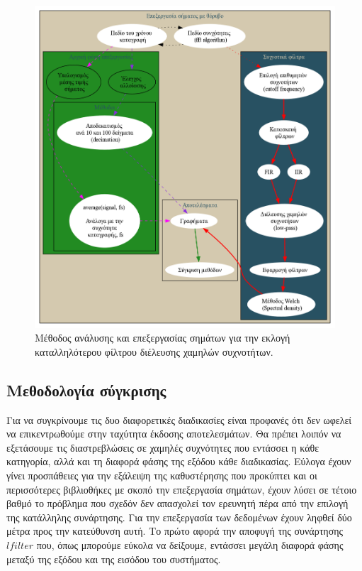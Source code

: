 \documentclass[breaklines=true, 12pt]{article}
\begin{document}
{{{\begin{figure}[htbp]
\centering
\includegraphics[width=.9\linewidth]{./flowcharts/proc-meth.png}
\caption{Μέθοδος ανάλυσης και επεξεργασίας σημάτων για την εκλογή καταλληλότερου φίλτρου διέλευσης χαμηλών συχνοτήτων.}
\end{figure}

\clearpage
\subsection{Μεθοδολογία σύγκρισης}
\label{sec:org70abfec}
Για να συγκρίνουμε τις δυο διαφορετικές διαδικασίες είναι προφανές ότι δεν
ωφελεί να επικεντρωθούμε στην ταχύτητα έκδοσης αποτελεσμάτων. Θα πρέπει λοιπόν
να εξετάσουμε τις διαστρεβλώσεις σε χαμηλές συχνότητες που εντάσσει η κάθε
κατηγορία, αλλά και τη διαφορά φάσης της εξόδου κάθε διαδικασίας. Εύλογα έχουν
γίνει προσπάθειες για την εξάλειψη της καθυστέρησης που προκύπτει και οι
περισσότερες βιβλιοθήκες με σκοπό την επεξεργασία σημάτων, έχουν λύσει σε
τέτοιο βαθμό το πρόβλημα που σχεδόν δεν απασχολεί τον ερευνητή πέρα από την
επιλογή της κατάλληλης συνάρτησης. Για την επεξεργασία των δεδομένων έχουν ληφθεί
δύο μέτρα προς την κατεύθυνση αυτή. Το πρώτο αφορά την αποφυγή της συνάρτησης
\(lfilter\) που, όπως μπορούμε εύκολα να δείξουμε, εντάσσει μεγάλη διαφορά φάσης
μεταξύ της εξόδου και της εισόδου του συστήματος.

}}}
\end{document}
